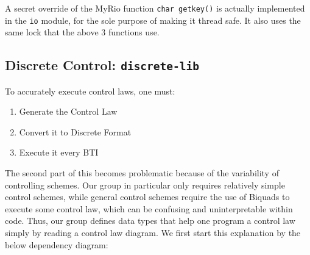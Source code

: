 \documentclass[letterpaper]{article}
\begin{document}
\begin{tcolorbox}[colframe=yellow!50!orange!50!black!75, title=Interesting Feature]
    A secret override of the MyRio function \texttt{char getkey()} is actually implemented in the \texttt{io} module, for the sole purpose of making it thread safe. It also uses the same lock that the above 3 functions use.
\end{tcolorbox}

\newpage

\subsection{Discrete Control: \texttt{discrete-lib}}

To accurately execute control laws, one must:
\begin{enumerate}
    \item Generate the Control Law
    \item Convert it to Discrete Format
    \item Execute it every BTI
\end{enumerate}
The second part of this becomes problematic because of the variability of controlling schemes. Our group in particular only requires relatively simple control schemes, while general control schemes require the use of Biquads to execute some control law, which can be confusing and uninterpretable within code. Thus, our group defines data types that help one program a control law simply by reading a control law diagram. We first start this explanation by the below dependency diagram:
\end{document}
